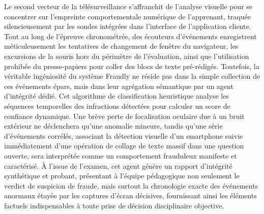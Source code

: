 Le second vecteur de la télésurveillance s'affranchit de l'analyse visuelle pour se concentrer sur l'empreinte comportementale numérique de l'apprenant, traquée silencieusement par les sondes intégrées dans l'interface de l'application cliente. Tout au long de l'épreuve chronométrée, des écouteurs d'événements enregistrent méticuleusement les tentatives de changement de fenêtre du navigateur, les excursions de la souris hors du périmètre de l'évaluation, ainsi que l'utilisation prohibée du presse-papiers pour coller des blocs de texte pré-rédigés. Toutefois, la véritable ingéniosité du système Fraudly ne réside pas dans la simple collection de ces événements épars, mais dans leur agrégation sémantique par un agent d'intégrité dédié. Cet algorithme de classification heuristique analyse les séquences temporelles des infractions détectées pour calculer un score de confiance dynamique. Une brève perte de focalisation oculaire due à un bruit extérieur ne déclenchera qu'une anomalie mineure, tandis qu'une série d'événements corrélés, associant la détection visuelle d'un smartphone suivie immédiatement d'une opération de collage de texte massif dans une question ouverte, sera interprétée comme un comportement frauduleux manifeste et caractérisé. À l'issue de l'examen, cet agent génère un rapport d'intégrité synthétique et probant, présentant à l'équipe pédagogique non seulement le verdict de suspicion de fraude, mais surtout la chronologie exacte des événements anormaux étayée par les captures d'écran décisives, fournissant ainsi les éléments factuels indispensables à toute prise de décision disciplinaire objective.
